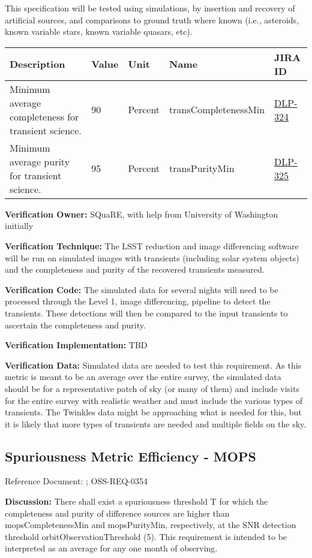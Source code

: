 \documentclass[DM,lsstdraft,toc]{lsstdoc}
\newcommand{\jira}[1]{\href{https://jira.lsstcorp.org/browse/#1}{#1}}
\begin{document}
This specification will be tested using simulations, by insertion and
recovery of artificial sources, and comparisons to ground truth where
known (i.e., asteroids, known variable stars, known variable quasars,
etc).

\begin{longtable}[]{@{}p{}llll@{}}
\toprule
Description & Value & Unit & Name & JIRA ID\tabularnewline
\midrule
\endhead
Minimum average completeness for transient science. & 90 & Percent &
transCompletenessMin & \jira{DLP-324}\tabularnewline
Minimum average purity for transient science. & 95 & Percent &
transPurityMin & \jira{DLP-325}\tabularnewline
\bottomrule
\end{longtable}

\textbf{Verification Owner:} SQuaRE, with help from University of
Washington initially

\textbf{Verification Technique:} The LSST reduction and image
differencing software will be run on simulated images with transients
(including solar system objects) and the completeness and purity of the
recovered transients measured.

\textbf{Verification Code:} The simulated data for several nights will
need to be processed through the Level 1, image differencing, pipeline
to detect the transients. These detections will then be compared to the
input transients to ascertain the completeness and purity.

\textbf{Verification Implementation:} TBD

\textbf{Verification Data:} Simulated data are needed to test this
requirement. As this metric is meant to be an average over the entire
survey, the simulated data should be for a representative patch of sky
(or many of them) and include visits for the entire survey with
realistic weather and must include the various types of transients. The
Twinkles data might be approaching what is needed for this, but it is
likely that more types of transients are needed and multiple fields on
the sky.

\subsection{Spuriousness Metric Efficiency -
MOPS}\label{spuriousness-metric-efficiency---mops}

Reference Document: ; OSS-REQ-0354

\textbf{Discussion:} There shall exist a spuriousness threshold T for
which the completeness and purity of difference sources are higher than
mopsCompletenessMin and mopsPurityMin, respectively, at the SNR
detection threshold orbitObservationThreshold (5). This requirement is
intended to be interpreted as an average for any one month of observing.
\end{document}
